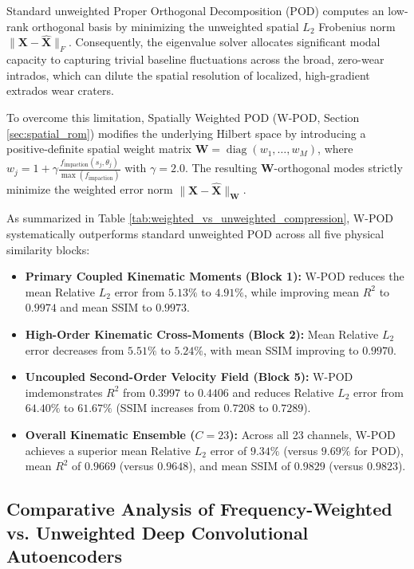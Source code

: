 \documentclass{article}
\begin{document}
Standard unweighted Proper Orthogonal Decomposition (POD) computes an low-rank orthogonal basis by minimizing the unweighted spatial $L_2$ Frobenius norm $\|\mathbf{X} - \hat{\mathbf{X}}\|_F$. Consequently, the eigenvalue solver allocates significant modal capacity to capturing trivial baseline fluctuations across the broad, zero-wear intrados, which can dilute the spatial resolution of localized, high-gradient extrados wear craters.

To overcome this limitation, Spatially Weighted POD (W-POD, Section \ref{sec:spatial_rom}) modifies the underlying Hilbert space by introducing a positive-definite spatial weight matrix $\mathbf{W} = \operatorname{diag}(w_1, \dots, w_M)$, where $w_j = 1 + \gamma \frac{f_{\text{impaction}}(s_j, \theta_j)}{\max(f_{\text{impaction}})}$ with $\gamma = 2.0$. The resulting $\mathbf{W}$-orthogonal modes strictly minimize the weighted error norm $\|\mathbf{X} - \hat{\mathbf{X}}\|_{\mathbf{W}}$. 

As summarized in Table \ref{tab:weighted_vs_unweighted_compression}, W-POD systematically outperforms standard unweighted POD across all five physical similarity blocks:
\begin{itemize}
    \item \textbf{Primary Coupled Kinematic Moments (Block 1):} W-POD reduces the mean Relative $L_2$ error from $5.13\%$ to $\mathbf{4.91\%}$, while improving mean $R^2$ to $\mathbf{0.9974}$ and mean SSIM to $\mathbf{0.9973}$.
    \item \textbf{High-Order Kinematic Cross-Moments (Block 2):} Mean Relative $L_2$ error decreases from $5.51\%$ to $\mathbf{5.24\%}$, with mean SSIM improving to $\mathbf{0.9970}$.
    \item \textbf{Uncoupled Second-Order Velocity Field (Block 5):} W-POD imdemonstrates $R^2$ from $0.3997$ to $\mathbf{0.4406}$ and reduces Relative $L_2$ error from $64.40\%$ to $\mathbf{61.67\%}$ (SSIM increases from $0.7208$ to $\mathbf{0.7289}$).
    \item \textbf{Overall Kinematic Ensemble ($C=23$):} Across all 23 channels, W-POD achieves a superior mean Relative $L_2$ error of $\mathbf{9.34\%}$ (versus $9.69\%$ for POD), mean $R^2$ of $\mathbf{0.9669}$ (versus $0.9648$), and mean SSIM of $\mathbf{0.9829}$ (versus $0.9823$).
\end{itemize}

\subsection{Comparative Analysis of Frequency-Weighted vs. Unweighted Deep Convolutional Autoencoders}
\label{sec:fwcnn_vs_unweighted}
\end{document}
